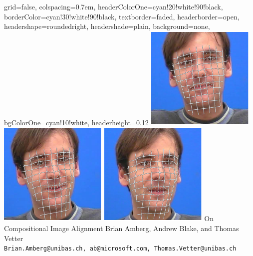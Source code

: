 \documentclass[landscape,a2paper,fontscale=0.6]{baposter}
\begin{document}
\begin{poster}{
 grid=false,
 colspacing=0.7em,
 headerColorOne=cyan!20!white!90!black,
 borderColor=cyan!30!white!90!black,
 textborder=faded,
 headerborder=open,
 headershape=roundedright,
 headershade=plain,
 background=none,
 bgColorOne=cyan!10!white,
 headerheight=0.12\textheight}
 {
      \includegraphics[width=0.08\linewidth]{track_frame_00010_06}
      \includegraphics[width=0.08\linewidth]{track_frame_00450_06}
      \includegraphics[width=0.08\linewidth]{track_frame_04999_06}
 }
 {\sc\Huge On Compositional Image Alignment}
 {Brian Amberg, Andrew Blake, and Thomas Vetter\\[1em]
 {\texttt{Brian.Amberg@unibas.ch, ab@microsoft.com, Thomas.Vetter@unibas.ch}}}
 {
  \begin{tabular}{r}

\end{tabular}}
\end{poster}
\end{document}
